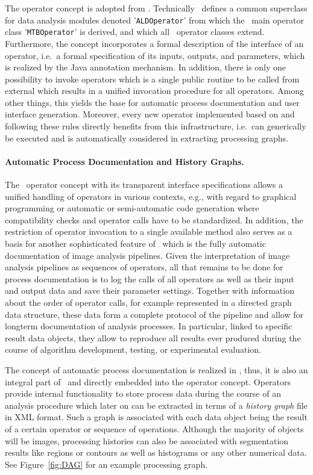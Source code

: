 The operator concept is adopted from \alida. Technically \alida\ defines a common superclass for
data analysis modules denoted '{\tt ALDOperator}' from which the \mitobo\ main operator
class '{\tt MTBOperator}' is derived, and which all \mitobo\ operator classes extend. 
Furthermore, the concept incorporates a formal description of the interface of an operator,
i.e.~a formal specification of its inputs, outputs, and parameters, which is realized by the Java annotation
mechanism. In addition, there is only one possibility to invoke operators which is a single public routine to be
called from external which results in a unified invocation procedure for all operators. Among other things, this 
yields the base for automatic process documentation and user interface generation.
Moreover, every new operator implemented based on \mitobo and following these rules directly benefits from this
infrastructure, i.e.~can generically be executed and is automatically considered in extracting processing graphs.

\paragraph{Automatic Process Documentation and History Graphs.} The \alida\ operator concept with its transparent
interface specifications allows a unified handling of operators in various contexts, e.g., with
regard to graphical programming or automatic or semi-automatic code generation
where compatibility checks and operator calls have to be standardized. In
addition, the restriction of operator invocation to a single available method
also serves as a basis for another sophisticated feature of \mitobo\ which is the
fully automatic
documentation of image analysis pipelines. Given the interpretation of image
analysis pipelines as sequences of operators, all that remains to be done for
process documentation is to log the calls of all operators as well as their input and
output data and save their parameter settings. Together with
information about the order of operator
calls, for example represented in a directed graph data structure, these data
form a complete protocol of the pipeline and allow for longterm documentation of
analysis processes. In particular, linked to specific result data
objects, they allow to reproduce all results ever produced during the course of
algorithm development, testing, or
experimental evaluation.

The concept of automatic process documentation is realized in \alida, thus, it is also an integral part of
\mitobo\ and directly embedded into the operator concept. Operators provide internal functionality to
store process data during the course of an analysis procedure which later on can be extracted in terms of a
{\em history graph} file in XML format. Such a graph is associated with each data object being the
result of a certain operator or sequence of operations. Although the majority of objects will be
images, processing histories can also be associated with
segmentation results like regions or contours as well as histograms or any
other numerical data. See Figure~\ref{fig:DAG} for an example processing graph.

